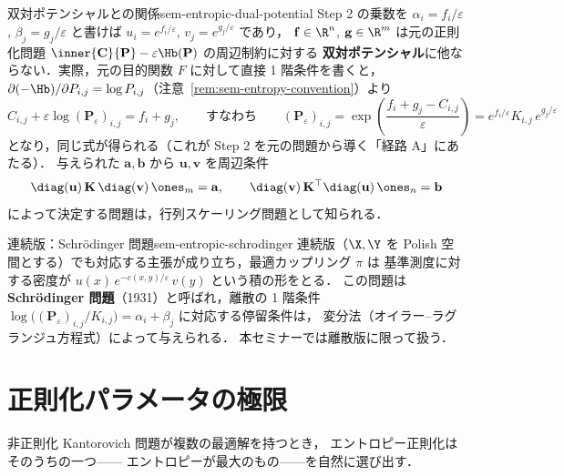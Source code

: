 \begin{remark}{双対ポテンシャルとの関係}{sem-entropic-dual-potential}
  Step 2 の乗数を $\alpha_i = f_i / \varepsilon$, $\beta_j = g_j / \varepsilon$ と書けば
  $u_i = e^{f_i / \varepsilon}$, $v_j = e^{g_j / \varepsilon}$ であり，
  $\mathbf{f} \in \R^n$, $\mathbf{g} \in \R^m$ は元の正則化問題
  $\inner{\mathbf{C}}{\mathbf{P}} - \varepsilon\Hb(\mathbf{P})$ の周辺制約に対する
  \textbf{双対ポテンシャル}に他ならない．実際，元の目的関数 $F$ に対して直接 1 階条件を書くと，
  $\partial(-\Hb)/\partial P_{i,j} = \log P_{i,j}$（注意~\ref{rem:sem-entropy-convention}）より
  \[
    C_{i,j} + \varepsilon\log(\mathbf{P}_\varepsilon)_{i,j} = f_i + g_j,
    \qquad\text{すなわち}\qquad
    (\mathbf{P}_\varepsilon)_{i,j} = \exp\!\left(\frac{f_i + g_j - C_{i,j}}{\varepsilon}\right)
    = e^{f_i / \varepsilon} K_{i,j}\, e^{g_j / \varepsilon}
  \]
  となり，同じ式が得られる（これが Step 2 を元の問題から導く「経路 A」にあたる）．
  与えられた $\mathbf{a}, \mathbf{b}$ から $\mathbf{u}, \mathbf{v}$ を周辺条件
  \[
    \diag(\mathbf{u})\,\mathbf{K}\,\diag(\mathbf{v})\,\ones_m = \mathbf{a},
    \qquad
    \diag(\mathbf{v})\,\mathbf{K}^\top\diag(\mathbf{u})\,\ones_n = \mathbf{b}
  \]
  によって決定する問題は，行列スケーリング問題として知られる．
\end{remark}

\begin{remark}{連続版：Schr\"odinger 問題}{sem-entropic-schrodinger}
  連続版（$\X, \Y$ を Polish 空間とする）でも対応する主張が成り立ち，最適カップリング $\pi$ は
  基準測度に対する密度が $u(x)\, e^{-c(x,y)/\varepsilon}\, v(y)$ という積の形をとる．
  この問題は \textbf{Schr\"odinger 問題}（1931）と呼ばれ，離散の 1 階条件
  $\log\bigl((\mathbf{P}_\varepsilon)_{i,j} / K_{i,j}\bigr) = \alpha_i + \beta_j$ に対応する停留条件は，
  変分法（オイラー–ラグランジュ方程式）によって与えられる．
  本セミナーでは離散版に限って扱う．
\end{remark}

\section{正則化パラメータの極限}
\label{sec:sem-epsilon-limits}

非正則化 Kantorovich 問題が複数の最適解を持つとき，
エントロピー正則化はそのうちの一つ——
エントロピーが最大のもの——を自然に選び出す．

